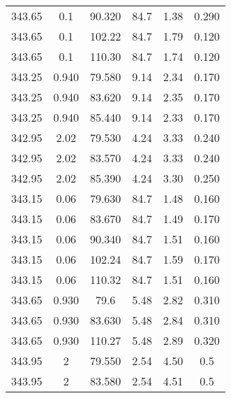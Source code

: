 \begin{longtable}{||c|c|c|c|c|c||}
343.65	&0.1	&90.320	&84.7	&1.38	&0.290\\
343.65	&0.1	&102.22	&84.7	&1.79	&0.120\\
343.65	&0.1	&110.30	&84.7	&1.74	&0.120\\
343.25	&0.940	&79.580	&9.14	&2.34	&0.170\\
343.25	&0.940	&83.620	&9.14	&2.35	&0.170\\
343.25	&0.940	&85.440	&9.14	&2.33	&0.170\\
342.95	&2.02	&79.530	&4.24	&3.33	&0.240\\
342.95	&2.02	&83.570	&4.24	&3.33	&0.240\\
342.95	&2.02	&85.390	&4.24	&3.30	&0.250\\
343.15	&0.06	&79.630	&84.7	&1.48	&0.160\\
343.15	&0.06	&83.670	&84.7	&1.49	&0.170\\
343.15	&0.06	&90.340	&84.7	&1.51	&0.160\\
343.15	&0.06	&102.24	&84.7	&1.59	&0.170\\
343.15	&0.06	&110.32	&84.7	&1.51	&0.160\\
343.65	&0.930	&79.6	&5.48	&2.82	&0.310\\
343.65	&0.930	&83.630	&5.48	&2.84	&0.310\\
343.65	&0.930	&110.27	&5.48	&2.89	&0.320\\
343.95	&2		&79.550	&2.54	&4.50	&0.5\\
343.95	&2		&83.580	&2.54	&4.51	&0.5\\
\hline
\end{longtable}

